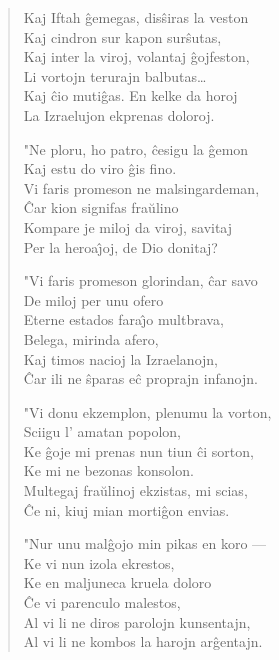 \begin{verse}
                  Kaj Iftah \^gemegas, dis\^siras la veston\\
                   \vin     Kaj cindron sur kapon sur\^sutas,\\
                  Kaj inter la viroj, volantaj \^gojfeston,\\
                   \vin     Li vortojn terurajn balbutas\dots\\
                  Kaj \^cio muti\^gas. En kelke da horoj\\
                  La Izraelujon ekprenas doloroj.

                  "Ne ploru, ho patro, \^cesigu la \^gemon\\
                   \vin     Kaj estu do viro \^gis fino.\\
                  Vi faris promeson ne malsingardeman,\\
                  \vin      \^Car kion signifas fra\u ulino\\
                  Kompare je miloj da viroj, savitaj\\
                  Per la heroa\^{\j}oj, de Dio donitaj?

                  "Vi faris promeson glorindan, \^car savo\\
                   \vin     De miloj per unu ofero\\
                  Eterne estados fara\^{\j}o multbrava,\\
                  \vin      Belega, mirinda afero,\\
                  Kaj timos nacioj la Izraelanojn,\\
                  \^Car ili ne \^sparas e\^c proprajn infanojn.

                  "Vi donu ekzemplon, plenumu la vorton,\\
                   \vin     Sciigu l' amatan popolon,\\
                  Ke \^goje mi prenas nun tiun \^ci sorton,\\
                   \vin     Ke mi ne bezonas konsolon.\\
                  Multegaj fra\u ulinoj ekzistas, mi scias,\\
                  \^Ce ni, kiuj mian morti\^gon envias.

                  "Nur unu mal\^gojo min pikas en koro ---\\
                  \vin      Ke vi nun izola ekrestos,\\
                  Ke en maljuneca kruela doloro\\
                  \vin      \^Ce vi parenculo malestos,\\
                  Al vi li ne diros parolojn kunsentajn,\\
                  Al vi li ne kombos la harojn ar\^gentajn.


\end{verse}
